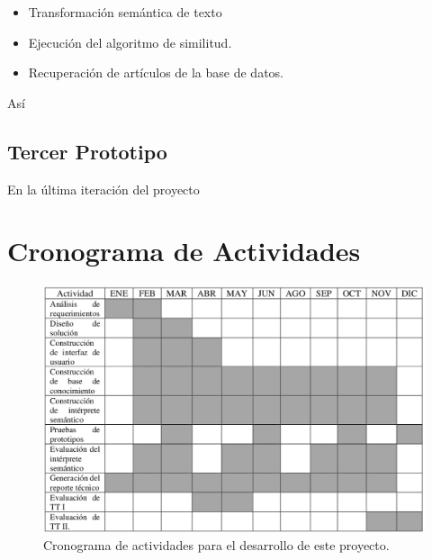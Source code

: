 \begin{itemize}
    \item Transformación semántica de texto
    \item Ejecución del algoritmo de similitud.
    \item Recuperación de artículos de la base de datos.
\end{itemize}


Así 

\subsection{Tercer Prototipo}

En la última iteración del proyecto 

\section{Cronograma de Actividades}

\begin{figure}[ht]
    \centering
    \includegraphics[scale=0.38]{images/6/cronograma}
    \caption{Cronograma de actividades para el desarrollo de este proyecto.}
    \label{fig:cronograma}
\end{figure}
